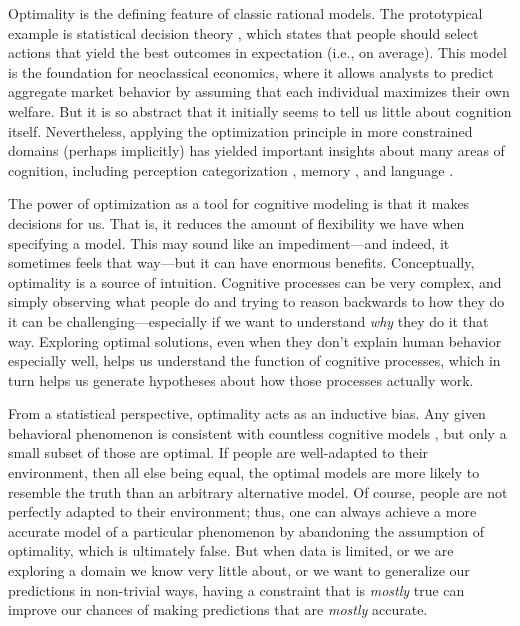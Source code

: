 Optimality is the defining feature of classic rational models. The prototypical example is statistical decision theory \citep{friedman1948utility}, which states that people should select actions that yield the best outcomes in expectation (i.e., on average). This model is the foundation for neoclassical economics, where it allows analysts to predict aggregate market behavior by assuming that each individual maximizes their own welfare. But it is so abstract that it initially seems to tell us little about cognition itself. Nevertheless, applying the optimization principle in more constrained domains (perhaps implicitly) has yielded important insights about many areas of cognition, including perception \citep{marr1982vision,knill1996perception,najemnik2005optimal} categorization \citep{anderson1991adaptive,ashby1995categorization,tenenbaum2001generalization}, memory \citep{anderson1989human}, and language \citep{goldwater2009bayesian}.

The power of optimization as a tool for cognitive modeling is that it makes decisions for us. That is, it reduces the amount of flexibility we have when specifying a model. This may sound like an impediment---and indeed, it sometimes feels that way---but it can have enormous benefits. Conceptually, optimality is a source of intuition. Cognitive processes can be very complex, and simply observing what people do and trying to reason backwards to how they do it can be challenging---especially if we want to understand \emph{why} they do it that way. Exploring optimal solutions, even when they don't explain human behavior especially well, helps us understand the function of cognitive processes, which in turn helps us generate hypotheses about how those processes actually work.

From a statistical perspective, optimality acts as an inductive bias. Any given behavioral phenomenon is consistent with countless cognitive models \citep{anderson1978arguments}, but only a small subset of those are optimal. If people are well-adapted to their environment, then all else being equal, the optimal models are more likely to resemble the truth than an arbitrary alternative model. Of course, people are not perfectly adapted to their environment; thus, one can always achieve a more accurate model of a particular phenomenon by abandoning the assumption of optimality, which is ultimately false. But when data is limited, or we are exploring a domain we know very little about, or we want to generalize our predictions in non-trivial ways, having a constraint that is \emph{mostly} true can improve our chances of making predictions that are \emph{mostly} accurate.

